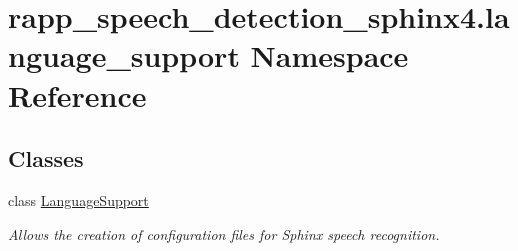 \hypertarget{namespacerapp__speech__detection__sphinx4_1_1language__support}{\section{rapp\-\_\-speech\-\_\-detection\-\_\-sphinx4.\-language\-\_\-support Namespace Reference}
\label{namespacerapp__speech__detection__sphinx4_1_1language__support}
}
\subsection*{Classes}
\begin{DoxyCompactItemize}
\item 
class \hyperlink{classrapp__speech__detection__sphinx4_1_1language__support_1_1LanguageSupport}{Language\-Support}
\begin{DoxyCompactList}\small\item\em Allows the creation of configuration files for Sphinx speech recognition. \end{DoxyCompactList}\end{DoxyCompactItemize}
